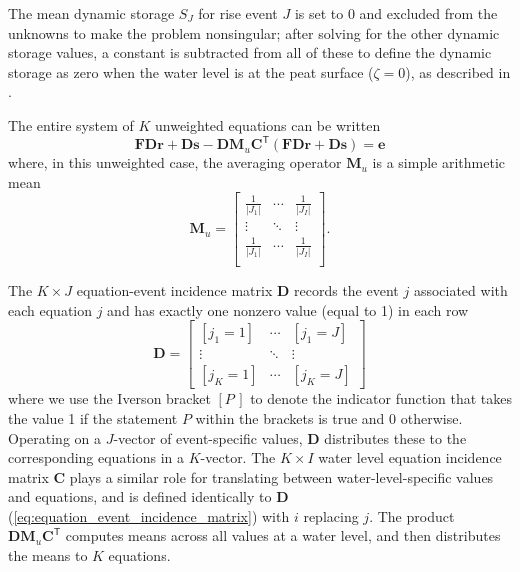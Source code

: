 \documentclass[11pt,a4paper]{article}
\renewcommand{\vec}[1]{\mathbf{#1}}
\begin{document}
The mean dynamic storage $S_J$ for rise event $J$ is set to 0 and
excluded from the unknowns to make the problem nonsingular; after
solving for the other dynamic storage values, a constant is subtracted
from all of these to define the dynamic storage as zero when the water
level is at the peat surface ($\zeta = 0$), as described in
\citet{Cobb_and_Harvey_2019}.

The entire system of $K$ unweighted equations can be written
\begin{equation}
  \label{eq:unweighted_equations}
  \vec{FD} \vec{r} + \vec{Ds} - \vec{D}\vec{M}_u\vec{C}^\mathsf{T}(\vec{FDr} + \vec{Ds}) = \vec{e}
\end{equation}
where, in this unweighted case, the averaging operator $\vec{M}_u$ is
a simple arithmetic mean
\begin{equation}
  \label{eq:unweighted_mean}
  \vec{M}_u = \left[
    \begin{array}{ccc}
      \frac{1}{|J_1|} & \cdots & \frac{1}{|J_I|} \\
      \vdots & \ddots & \vdots \\
      \frac{1}{|J_1|} & \cdots & \frac{1}{|J_I|} \\
    \end{array}
  \right].
\end{equation}

The $K\times J$ equation-event incidence matrix $\vec{D}$ records the
event $j$ associated with each equation $j$ and has exactly one
nonzero value (equal to 1) in each row
\begin{equation}
  \label{eq:equation_event_incidence_matrix}
  \vec{D} = \left[
    \begin{array}{ccc}
      \left[j_1 = 1\right] & \cdots & \left[j_1 = J\right] \\ 
      \vdots & \ddots & \vdots \\
      \left[j_K = 1\right] & \cdots & \left[j_K = J\right]
    \end{array}
  \right]
\end{equation}
where we use the Iverson bracket $[P\,]$ to denote the indicator
function that takes the value 1 if the statement $P$ within the
brackets is true and 0 otherwise.  Operating on a $J$-vector of
event-specific values, $\vec{D}$ distributes these to the
corresponding equations in a $K$-vector.  The $K\times I$ water level
equation incidence matrix $\vec{C}$ plays a similar role for
translating between water-level-specific values and equations, and is
defined identically to $\vec{D}$
(\ref{eq:equation_event_incidence_matrix}) with $i$ replacing $j$.
The product $\vec{D}\vec{M}_u\vec{C}^\mathsf{T}$ computes means across
all values at a water level, and then distributes the means to $K$
equations.
\end{document}
